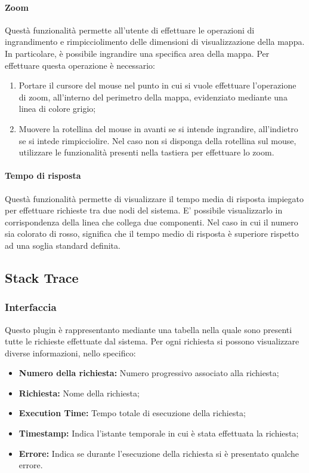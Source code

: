 \paragraph{Zoom} \Spazio
Questà funzionalità permette all'utente di effettuare le operazioni di ingrandimento e rimpicciolimento delle dimensioni di visualizzazione della mappa. In particolare, è possibile ingrandire una specifica area della mappa.
Per effettuare questa operazione è necessario:

\begin{enumerate}
	
	\item Portare il cursore del mouse nel punto in cui si vuole effettuare l'operazione di zoom, all'interno del perimetro della mappa, evidenziato mediante una linea di colore grigio;
	\item Muovere la rotellina del mouse in avanti se si intende ingrandire, all'indietro se si intede rimpicciolire. Nel caso non si disponga della rotellina sul mouse, utilizzare le funzionalità presenti nella tastiera per effettuare lo zoom.
	
\end{enumerate}

\paragraph{Tempo di risposta} \Spazio
Questà funzionalità permette di visualizzare il tempo media di risposta impiegato per effettuare richieste tra due nodi del sistema.
E' possibile visualizzarlo in corrispondenza della linea che collega due componenti.
Nel caso in cui il numero sia colorato di rosso, significa che il tempo medio di risposta è superiore rispetto ad una soglia standard definita.




\subsection{Stack Trace}
\subsubsection{Interfaccia}
Questo plugin è rappresentanto mediante una tabella nella quale sono presenti tutte le richieste effettuate dal sistema. Per ogni richiesta si possono visualizzare diverse informazioni, nello specifico:
   
    \begin{itemize}
    	
    	\item \textbf{Numero della richiesta:} Numero progressivo associato alla richiesta;
    	\item \textbf{Richiesta:} Nome della richiesta;
    	\item \textbf{Execution Time:} Tempo totale di esecuzione della richiesta;
    	\item \textbf{Timestamp:} Indica l'istante temporale in cui è stata effettuata la richiesta;
    	\item \textbf{Errore:} Indica se durante l'esecuzione della richiesta si è presentato qualche errore.
    	
    	\end{itemize}

